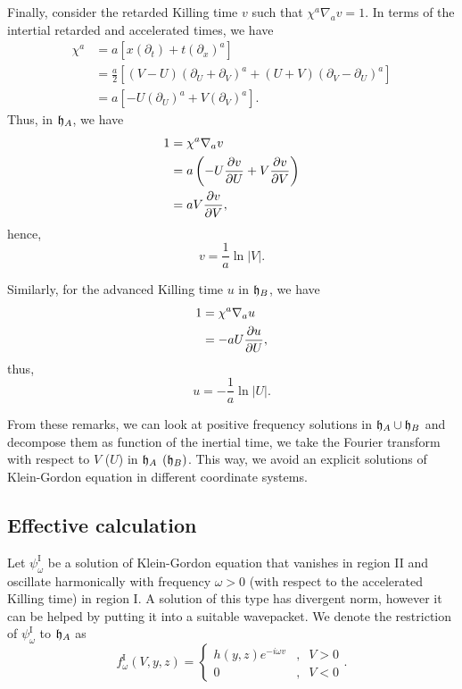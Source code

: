 Finally, consider the retarded Killing time \(v\) such that \(\chi^a\nabla_a v=1\). In terms of the intertial retarded and accelerated times, we have
\begin{subequations}
    \begin{align}
        \chi^a&=a\left[x\left(\partial_t\right)+t\left(\partial_x\right)^a\right]\\
        &=\frac{a}{2}\left[(V-U)\left(\partial_U+\partial_V\right)^a+(U+V)\left(\partial_V-\partial_U\right)^a\right]\\
        &=a\left[-U\left(\partial_U\right)^a+V\left(\partial_V\right)^a\right].
    \end{align}
\end{subequations}
Thus, in \({\mathfrak{h}}_A\), we have
\begin{subequations}
    \begin{align}
        1&=\chi^a\nabla_a v\\
        &=a\left(-U\diffp{v}{U}+V\diffp{v}{V}\right)\\
        &=aV\diffp{v}{V},
    \end{align}
\end{subequations}
hence,
\begin{equation}
    v=\frac{1}{a}\ln{\lvert V\rvert}.
\end{equation}

Similarly, for the advanced Killing time \(u\) in \({\mathfrak{h}}_B\), we have
\begin{subequations}
    \begin{align}
        1&=\chi^a\nabla_au\\
        &=-aU\diffp{u}{U},
    \end{align}
\end{subequations}
thus,
\begin{equation}
    u=-\frac{1}{a}\ln{\lvert U\rvert}.
\end{equation}

From these remarks, we can look at positive frequency solutions in \({\mathfrak{h}}_A\cup{\mathfrak{h}}_B\) and decompose them as function of the inertial time, we take the Fourier transform with respect to \(V\) (\(U\)) in \({\mathfrak{h}}_A\) \(({\mathfrak{h}}_B)\). This way, we avoid an explicit solutions of Klein-Gordon equation in different coordinate systems.

\subsection*{Effective calculation}
Let \(\psi^{\text{I}}_\omega\) be a solution of Klein-Gordon equation that vanishes in region II and oscillate harmonically with frequency \(\omega>0\) (with respect to the accelerated Killing time) in region I. A solution of this type has divergent norm, however it can be helped by putting it into a suitable wavepacket. We denote the restriction of \(\psi^{\text{I}}_\omega\) to \({\mathfrak{h}}_A\) as
\begin{equation}
    f^{\text{I}}_\omega(V,y,z)=
    \begin{cases}
        h(y,z)e^{-i\omega v}&,\;\;V>0\\
        0&,\;\;V<0
    \end{cases}.
\end{equation}

